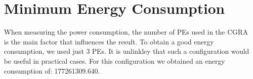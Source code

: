
	\section{Minimum Energy Consumption} %
	\label{sec:impl_min_energy}
	When measuring the power consumption, the number of PEs used in the CGRA is the main factor that influences the result. To obtain a good energy consumption, we used just 3 PEs. It is unlinkley that such a configuration would be useful in practical cases. For this configuration we obtained an energy consumption of: 177261309.640.
		




